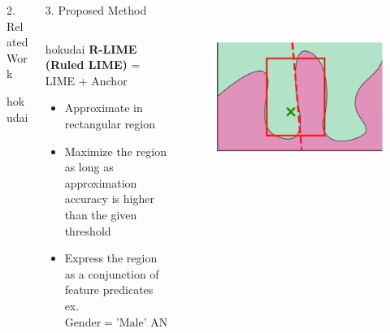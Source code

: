 \documentclass[unicode]{beamer}
\begin{document}
\begin{frame}
\begin{columns}[t]
\begin{column}{\lcol\linewidth}
\begin{block}{2. Related Work}
{\begin{center}
\begin{beamercolorbox}[wd=0.7\textwidth,colsep=0.3cm,rounded=true,shadow=true]{hokudai}
\begin{itemize}
              \end{itemize}
              \vspace{0.1em}
            \end{beamercolorbox}~%
          \end{center}
        }
        \vspace{-0.25em}
      \end{block}
    \end{column}
    \begin{column}{\rcol\textwidth}
      \begin{block}{3. Proposed Method}
        \begin{columns}[]
          \begin{column}{0.6\textwidth}
            \begin{beamercolorbox}[wd=.77\textwidth,colsep=0.3cm,rounded=true,shadow=true]{hokudai}
              \textbf{R-LIME (Ruled LIME)} = LIME + Anchor
            \end{beamercolorbox}
            \vspace{0.3em}
            \begin{itemize}
              \item Approximate in rectangular region
              \item Maximize the region as long as approximation accuracy is
                    higher than the given threshold
              \item Express the region as a conjunction of feature predicates \\[0.5em]
                    \hspace{0.2em}\small{
                      ex. $\textrm{Gender} = \textrm{'Male' AND } 20\le\textrm{Age} < 30$
                    }
            \end{itemize}
          \end{column}
          \begin{column}{0.3\textwidth}
            \begin{figure}
              \includegraphics[width=\textwidth]{src/img/visual-rlime3}

\end{figure}
\end{column}
\end{columns}
\end{block}
\end{column}
\end{columns}
\end{frame}
\end{document}
